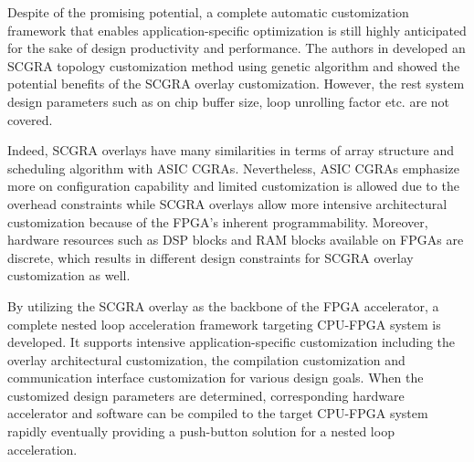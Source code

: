 Despite of the promising potential, a complete automatic customization 
framework that enables application-specific optimization is still highly 
anticipated for the sake of design productivity and performance. 
The authors in \cite{colinheart} developed an SCGRA topology customization method 
using genetic algorithm and showed the potential benefits of the SCGRA 
overlay customization. However, the rest system design parameters such as 
on chip buffer size, loop unrolling factor etc. are not covered. 

Indeed, SCGRA overlays have many similarities in terms of array structure 
and scheduling algorithm with ASIC CGRAs. Nevertheless, ASIC CGRAs emphasize 
more on configuration capability and limited customization is allowed due 
to the overhead constraints \cite{zhou2014application, miniskar2014retargetable} 
while SCGRA overlays allow more intensive architectural customization 
because of the FPGA's inherent programmability. Moreover, hardware resources such as 
DSP blocks and RAM blocks available on FPGAs are discrete, which results in different 
design constraints for SCGRA overlay customization as well. 

By utilizing the SCGRA overlay as the backbone of the FPGA accelerator, 
a complete nested loop acceleration framework 
targeting CPU-FPGA system is developed. It supports intensive application-specific
customization including the overlay architectural customization, 
the compilation customization and communication interface customization 
for various design goals. When the customized design parameters are determined, 
corresponding hardware accelerator and software can be compiled to the target 
CPU-FPGA system rapidly eventually providing a push-button solution for a nested loop 
acceleration. 


